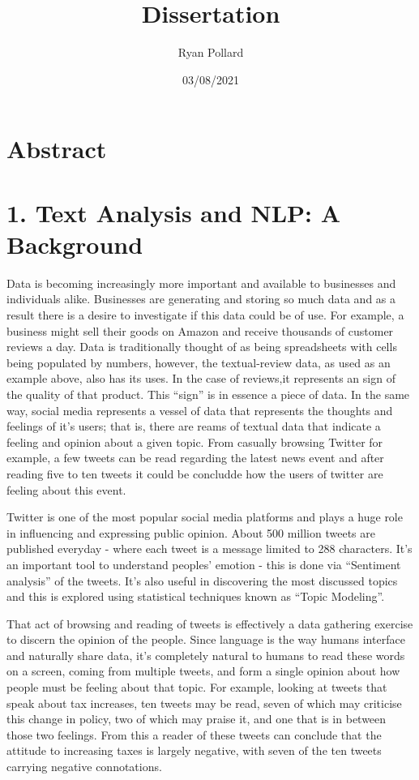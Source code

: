 \documentclass[
]{article}
\title{Dissertation}
\author{Ryan Pollard}
\date{03/08/2021}
\begin{document}
\maketitle

\tableofcontents
\pagebreak

\hypertarget{abstract}{%
\section{Abstract}\label{abstract}}

\hypertarget{text-analysis-and-nlp-a-background}{%
\section{1. Text Analysis and NLP: A
Background}\label{text-analysis-and-nlp-a-background}}

Data is becoming increasingly more important and available to businesses
and individuals alike. Businesses are generating and storing so much
data and as a result there is a desire to investigate if this data could
be of use. For example, a business might sell their goods on Amazon and
receive thousands of customer reviews a day. Data is traditionally
thought of as being spreadsheets with cells being populated by numbers,
however, the textual-review data, as used as an example above, also has
its uses. In the case of reviews,it represents an sign of the quality of
that product. This ``sign'' is in essence a piece of data. In the same
way, social media represents a vessel of data that represents the
thoughts and feelings of it's users; that is, there are reams of textual
data that indicate a feeling and opinion about a given topic. From
casually browsing Twitter for example, a few tweets can be read
regarding the latest news event and after reading five to ten tweets it
could be concludde how the users of twitter are feeling about this
event.

Twitter is one of the most popular social media platforms and plays a
huge role in influencing and expressing public opinion. About 500
million tweets are published everyday - where each tweet is a message
limited to 288 characters. It's an important tool to understand peoples'
emotion - this is done via ``Sentiment analysis'' of the tweets. It's
also useful in discovering the most discussed topics and this is
explored using statistical techniques known as ``Topic Modeling''.

That act of browsing and reading of tweets is effectively a data
gathering exercise to discern the opinion of the people. Since language
is the way humans interface and naturally share data, it's completely
natural to humans to read these words on a screen, coming from multiple
tweets, and form a single opinion about how people must be feeling about
that topic. For example, looking at tweets that speak about tax
increases, ten tweets may be read, seven of which may criticise this
change in policy, two of which may praise it, and one that is in between
those two feelings. From this a reader of these tweets can conclude that
the attitude to increasing taxes is largely negative, with seven of the
ten tweets carrying negative connotations.
\end{document}

